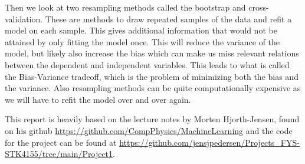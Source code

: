 Then we look at two resampling methods called the bootstrap and cross-validation. These are methods to draw repeated samples of the data and refit a model on each sample. This gives additional information that would not be attained by only fitting the model once. This will reduce the variance of the model, but likely also increase the bias which can make us miss relevant relations between the dependent and independent variables. This leads to what is called the Bias-Variance tradeoff, which is the problem of minimizing both the bias and the variance. Also resampling methods can be quite computationally expensive as we will have to refit the model over and over again.

This report is heavily based on the lecture notes by Morten Hjorth-Jensen, found on his github \href{https://github.com/CompPhysics/MachineLearning}{https://github.com/CompPhysics/MachineLearning} and the code for the project can be found at \href{https://github.com/jensjpedersen/Projects_FYS-STK4155/tree/main/Project1}{https://github.com/jensjpedersen/Projects_FYS-STK4155/tree/main/Project1}.